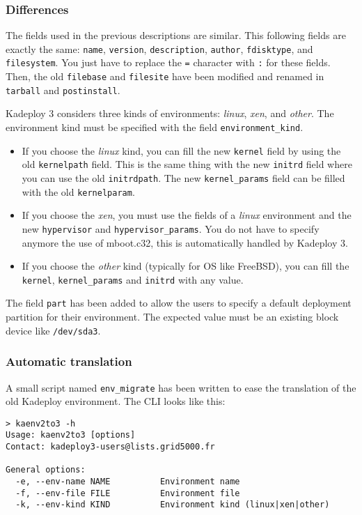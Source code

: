 \documentclass[a4wide,10pt,oneside]{book}
\begin{document}
\subsubsection{Differences}
The fields used in the previous descriptions are similar. This following fields are exactly the same: \texttt{name}, \texttt{version}, \texttt{description}, \texttt{author}, \texttt{fdisktype}, and \texttt{filesystem}. You just have to replace the \texttt{=} character with \texttt{:} for these fields.
Then, the old \texttt{filebase} and \texttt{filesite} have been modified and renamed in \texttt{tarball} and \texttt{postinstall}.

Kadeploy 3 considers three kinds of environments: \textit{linux}, \textit{xen}, and \textit{other}. The environment kind must be specified with the field \texttt{environment\_kind}.
\begin{itemize}
\item If you choose the \textit{linux} kind, you can fill the new \texttt{kernel} field by using the old \texttt{kernelpath} field. This is the same thing with the new \texttt{initrd} field where you can use the old \texttt{initrdpath}. The new \texttt{kernel\_params} field can be filled with the old \texttt{kernelparam}.
\item If you choose the \textit{xen}, you must use the fields of a \textit{linux} environment and the new \texttt{hypervisor} and \texttt{hypervisor\_params}. You do not have to specify anymore the use of mboot.c32, this is automatically handled by Kadeploy 3.
\item If you choose the \textit{other} kind (typically for OS like FreeBSD), you can fill the \texttt{kernel}, \texttt{kernel\_params} and \texttt{initrd} with any value.
\end{itemize}

The field \texttt{part} has been added to allow the users to specify a default deployment partition for their environment. The expected value must be an existing block device like \texttt{/dev/sda3}.

\subsubsection{Automatic translation}
A small script named \texttt{env\_migrate} has been written to ease the translation of the old Kadeploy environment. The CLI looks like this:

\begin{small}
\begin{verbatim}
> kaenv2to3 -h
Usage: kaenv2to3 [options]
Contact: kadeploy3-users@lists.grid5000.fr

General options:
  -e, --env-name NAME          Environment name
  -f, --env-file FILE          Environment file
  -k, --env-kind KIND          Environment kind (linux|xen|other)
\end{verbatim}
\end{small}
\end{document}
